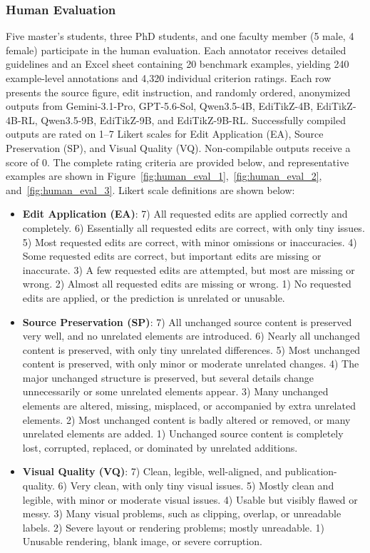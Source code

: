 \subsubsection{Human Evaluation}
\label{subsubsec:Human Evaluation}
Five master's students, three PhD students, and one faculty member (5 male, 4 female) participate in the human evaluation. Each annotator receives detailed guidelines and an Excel sheet containing 20 benchmark examples, yielding 240 example-level annotations and 4,320 individual criterion ratings. Each row presents the source figure, edit instruction, and randomly ordered, anonymized outputs from Gemini-3.1-Pro, GPT-5.6-Sol, Qwen3.5-4B, EdiTikZ-4B, EdiTikZ-4B-RL, Qwen3.5-9B, EdiTikZ-9B, and EdiTikZ-9B-RL. Successfully compiled outputs are rated on 1--7 Likert scales for Edit Application (EA), Source Preservation (SP), and Visual Quality (VQ). Non-compilable outputs receive a score of 0. The complete rating criteria are provided below, and representative examples are shown in Figure~\ref{fig:human_eval_1},~\ref{fig:human_eval_2}, and~\ref{fig:human_eval_3}. Likert scale definitions are shown below:
\begin{itemize}
\item \textbf{Edit Application (EA)}: 7) All requested edits are applied correctly and completely. 6) Essentially all requested edits are correct, with only tiny issues. 5) Most requested edits are correct, with minor omissions or inaccuracies. 4) Some requested edits are correct, but important edits are missing or inaccurate. 3) A few requested edits are attempted, but most are missing or wrong. 2) Almost all requested edits are missing or wrong. 1) No requested edits are applied, or the prediction is unrelated or unusable.
\item \textbf{Source Preservation (SP)}: 7) All unchanged source content is preserved very well, and no unrelated elements are introduced. 6) Nearly all unchanged content is preserved, with only tiny unrelated differences. 5) Most unchanged content is preserved, with only minor or moderate unrelated changes. 4) The major unchanged structure is preserved, but several details change unnecessarily or some unrelated elements appear. 3) Many unchanged elements are altered, missing, misplaced, or accompanied by extra unrelated elements. 2) Most unchanged content is badly altered or removed, or many unrelated elements are added. 1) Unchanged source content is completely lost, corrupted, replaced, or dominated by unrelated additions.
\item \textbf{Visual Quality (VQ)}: 7) Clean, legible, well-aligned, and publication-quality. 6) Very clean, with only tiny visual issues. 5) Mostly clean and legible, with minor or moderate visual issues. 4) Usable but visibly flawed or messy. 3) Many visual problems, such as clipping, overlap, or unreadable labels. 2) Severe layout or rendering problems; mostly unreadable. 1) Unusable rendering, blank image, or severe corruption.
\end{itemize}
